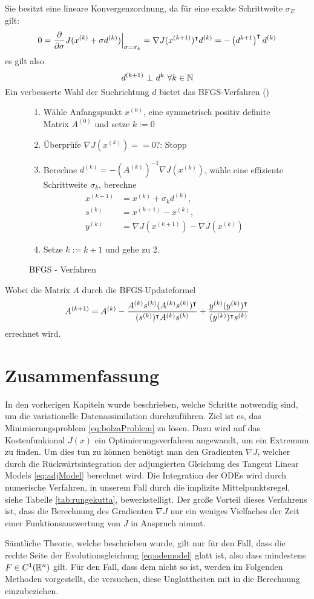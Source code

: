 Sie besitzt eine lineare Konvergenzordnung, da für eine exakte Schrittweite $\sigma_E$ gilt:
\[
 0 = \frac{\partial }{\partial \sigma} J(x^{(k)} + \sigma d^{(k)}) \Big|_{\sigma = \sigma_k} = \nabla J(x^{(k+1)})^\intercal d^{(k)} = - \left( d^{k+1}\right)^\intercal d^{(k)}
\]
es gilt also
\[
 d^{(k+1)}~\bot ~d^{k} ~ \forall k \in \mathbb{N}
\]
Ein verbesserte Wahl der Suchrichtung $d$ bietet das BFGS-Verfahren (\cite[Verfahren 4.8.11]{alt2002nichtlineare})
\begin{figure}[H]
\begin{framed}
\begin{enumerate}
 \item Wähle Anfangspunkt $x^{(0)}$, eine symmetrisch positiv definite Matrix $A^{(0)}$ und setze $k:=0$
 \item Überprüfe $\nabla J(x^{(k)}) == 0$?: Stopp
 \item Berechne $d^{(k)} = -\left( A^{(k)} \right)^{-1} \nabla J(x^{(k)})$, wähle eine effiziente Schrittweite $\sigma_k$, berechne 
 \[
 \begin{aligned}
  x^{(k+1)} &= x^{(k)} + \sigma_k d^{(k)}, \\ s^{(k)} &= x^{(k+1)} - x^{(k)},\\ y^{(k)} &= \nabla J(x^{(k+1)})- \nabla J(x^{(k)})
 \end{aligned}
 \]
 \item Setze $k:= k+1$ und gehe zu 2.
\end{enumerate} 
\end{framed}
 \caption{BFGS - Verfahren}
 \label{alg:bfgs}
\end{figure}
Wobei die Matrix $A$ durch die BFGS-Updateformel 
\[
 A^{(k+1)} = A^{(k)} - \frac{A^{(k)}s^{(k)}(A^{(k)}s^{(k)})^\intercal}{(s^{(k)})^\intercal A^{(k)}s^{(k)}} + \frac{y^{(k)} (y^{(k)})^\intercal}{(y^{(k)})^\intercal s^{(k)}}
\]
errechnet wird.


\section{Zusammenfassung}
In den vorherigen Kapiteln wurde beschrieben, welche Schritte notwendig sind, um die variationelle Datenassimilation durchzuführen.
Ziel ist es, das Minimierungsproblem \eqref{eq:bolzaProblem} zu lösen. Dazu wird auf das Kostenfunkional $J(x)$ ein Optimierungsverfahren angewandt, um ein Extremum zu finden. Um dies tun zu können benötigt man den Gradienten $\nabla J$, welcher durch die Rückwärtsintegration der  adjungierten Gleichung des Tangent Linear Models \eqref{eq:adjModel} berechnet wird. Die Integration der ODEs wird durch numerische Verfahren, in unserem Fall durch die implizite Mittelpunktsregel, siehe Tabelle \ref{tab:rungekutta}, bewerkstelligt. Der große Vorteil dieses Verfahrens ist, dass die Berechnung des Gradienten $\nabla J$ nur ein weniges Vielfaches der Zeit einer Funktionsauswertung von $J$ in Anspruch nimmt. 

Sämtliche Theorie, welche beschrieben wurde, gilt nur für den Fall, dass die rechte Seite der Evolutionsgleichung \eqref{eq:odemodel} glatt ist, also dass mindestens $F\in C^1(\mathbb{R}^n)$ gilt. Für den Fall, dass dem nicht so ist, werden im Folgenden Methoden vorgestellt, die versuchen, diese Unglattheiten mit in die Berechnung einzubeziehen.
